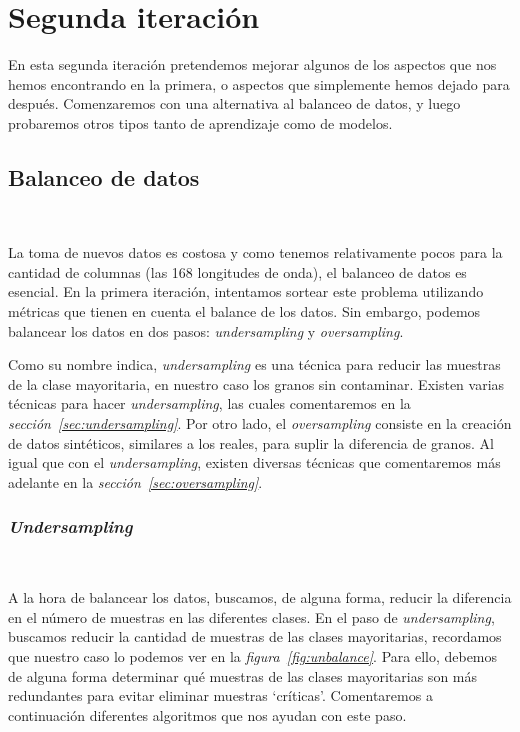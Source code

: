 \section{Segunda iteración}

En esta segunda iteración pretendemos mejorar algunos de los aspectos que nos hemos encontrando en la primera, o aspectos que simplemente hemos dejado para después. Comenzaremos con una alternativa al balanceo de datos, y luego probaremos otros tipos tanto de aprendizaje como de modelos.

\subsection{Balanceo de datos}\ \label{sec:i2-balance}

La toma de nuevos datos es costosa y como tenemos relativamente pocos para la cantidad de columnas (las 168 longitudes de onda), el balanceo de datos es esencial. En la primera iteración, intentamos sortear este problema utilizando métricas que tienen en cuenta el balance de los datos. Sin embargo, podemos balancear los datos en dos pasos: \textit{undersampling} y \textit{oversampling}. 

Como su nombre indica, \textit{undersampling} es una técnica para reducir las muestras de la clase mayoritaria, en nuestro caso los granos sin contaminar. Existen varias técnicas para hacer \textit{undersampling}, las cuales comentaremos en la \textit{sección\ \ref{sec:undersampling}}. Por otro lado, el \textit{oversampling} consiste en la creación de datos sintéticos, similares a los reales, para suplir la diferencia de granos. Al igual que con el \textit{undersampling}, existen diversas técnicas que comentaremos más adelante en la \textit{sección\ \ref{sec:oversampling}}.


\subsubsection{\textit{Undersampling}}\ \label{sec:undersampling}

A la hora de balancear los datos, buscamos, de alguna forma, reducir la diferencia en el número de muestras en las diferentes clases. En el paso de \textit{undersampling}, buscamos reducir la cantidad de muestras de las clases mayoritarias, recordamos que nuestro caso lo podemos ver en la \textit{figura\ \ref{fig:unbalance}}. Para ello, debemos de alguna forma determinar qué muestras de las clases mayoritarias son más redundantes para evitar eliminar muestras `críticas'. Comentaremos a continuación diferentes algoritmos que nos ayudan con este paso.

